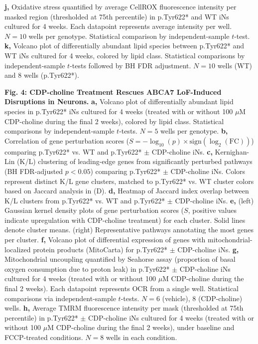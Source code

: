 \textbf{j,} Oxidative stress quantified by average CellROX fluorescence intensity per masked region (thresholded at 75th percentile) in p.Tyr622* and WT iNs cultured for 4 weeks. Each datapoint represents average intensity per well. $N=10$ wells per genotype. Statistical comparison by independent-sample $t$-test.
\textbf{k,} Volcano plot of differentially abundant lipid species between p.Tyr622* and WT iNs cultured for 4 weeks, colored by lipid class. Statistical comparisons by independent-sample $t$-tests followed by BH FDR adjustment. $N=10$ wells (WT) and $8$ wells (p.Tyr622*).

\textbf{Fig. 4: CDP-choline Treatment Rescues ABCA7 LoF-Induced Disruptions in Neurons.}\newline  %
\textbf{a,} Volcano plot of differentially abundant lipid species in p.Tyr622* iNs cultured for 4 weeks (treated with or without 100 $\mu$M CDP-choline during the final 2 weeks), colored by lipid class.  Statistical comparisons by independent-sample $t$-tests. $N=5$ wells per genotype.
\textbf{b,} Correlation of gene perturbation scores ($S = -\log_{10}(p)\times\text{sign}(\log_2(\text{FC}))$) comparing p.Tyr622* vs. WT and p.Tyr622* $\pm$ CDP-choline iNs.
\textbf{c,} Kernighan-Lin (K/L) clustering of leading-edge genes from significantly perturbed pathways (BH FDR-adjusted $p<0.05$) comparing p.Tyr622* $\pm$ CDP-choline iNs. Colors represent distinct K/L gene clusters, matched to p.Tyr622* vs. WT cluster colors based on Jaccard analysis in (D).
\textbf{d,} Heatmap of Jaccard index overlap between K/L clusters from p.Tyr622* vs. WT and p.Tyr622* $\pm$ CDP-choline iNs.
\textbf{e,} (left) Gaussian kernel density plots of gene perturbation scores ($S$, positive values indicate upregulation with CDP-choline treatment) for each cluster. Solid lines denote cluster means. (right) Representative pathways annotating the most genes per cluster.
\textbf{f,} Volcano plot of differential expression of genes with mitochondrial-localized protein products (MitoCarta) for p.Tyr622* $\pm$ CDP-choline iNs.
\textbf{g,} Mitochondrial uncoupling quantified by Seahorse assay (proportion of basal oxygen consumption due to proton leak) in p.Tyr622* $\pm$ CDP-choline iNs cultured for 4 weeks (treated with or without 100 $\mu$M CDP-choline during the final 2 weeks). Each datapoint represents OCR from a single well. Statistical comparisons via independent-sample $t$-tests. $N=6$ (vehicle), $8$ (CDP-choline) wells.
\textbf{h,} Average TMRM fluorescence intensity per mask (thresholded at 75th percentile) in p.Tyr622* $\pm$ CDP-choline iNs cultured for 4 weeks (treated with or without 100 $\mu$M CDP-choline during the final 2 weeks), under baseline and FCCP-treated conditions. $N=8$ wells in each condition.
